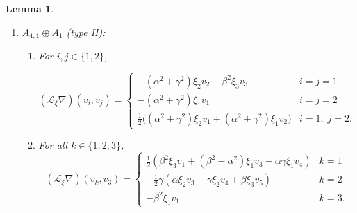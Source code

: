 \documentclass[10pt]{article}
\newtheorem{Lemma}{Lemma}
\begin{document}
\begin{Lemma}
\begin{enumerate}
\begin{enumerate}
\begin{align*} 
(\mathscr{L}_\xi\nabla)(v_i,v_j)=\tfrac{1}{2}\Big(a_j g_i+b_j h_i+ a_i g_j+b_i h_j\Big). 
\end{align*}
\item For $i\in\{1,2,3\}$, and $j=3$.\\  
\[
(\mathscr{L}_\xi\nabla)(v_i,v_3) =
\begin{cases} 
\tfrac{1}{2}\Big(\beta(\gamma\xi_2+\beta\xi_3)v_1+\beta\gamma\xi_1 v_2+(\beta^2-\alpha^2)\xi_1 v_3-\alpha\gamma\xi_1 v_5\Big) & i=1 \\ 
-\tfrac{1}{2}\Big(2\beta\gamma\xi_1 v_1+\alpha^2\xi_2 v_3 +\alpha(\gamma\xi_2+\beta\xi_3) v_5\Big)& i=2\\
-\beta^2\xi_1 v_1&i=3.
\end{cases}
\]
\item For $i\in \{1,2,3,5\}$ and $j=5.$

\[
(\mathscr{L}_\xi\nabla)(v_i,v_5) =
\begin{cases} 
\tfrac{1}{2}\Big(\alpha\beta\xi_2v_1-\alpha\gamma\xi_1 v_3+(\beta^2+\gamma^2)\xi_1 v_5\Big) & i=1 \\ 
-\tfrac{1}{2}\Big(2\beta\gamma\xi_1 v_1+\alpha^2\xi_2 v_3 +\alpha(\gamma\xi_2+\beta\xi_3) v_5\Big)& i=2\\
\tfrac{1}{2}\beta\Big(-\alpha\xi_2v_3-(\gamma\xi_2+\beta\xi_3)v_5\Big)&i=3\\
0&i=5.
\end{cases}
\]
\end{enumerate}


  \item \(A_{4,1}\oplus A_1\) (type II):\\
  \begin{enumerate}
      \item  For $i,j\in\{1,2\}$,

      \begin{equation*} 
( \mathscr{L}_\xi\nabla)(v_i,v_j)=\begin{cases} 
-(\alpha^2+\gamma^2)\xi_2v_2-\beta^2\xi_3v_3 & i=j=1\\ 
-(\alpha^2+\gamma^2)\xi_1v_1 & i=j=2\\ 
\tfrac{1}{2}\Big((\alpha^2+\gamma^2)\xi_2v_1+(\alpha^2+\gamma^2)\xi_1v_2\Big) & i=1,\; j=2. 
\end{cases}
\end{equation*}
  
\item For all $k\in\{1,2,3\}$,
\begin{equation*} (\mathscr{L}_\xi\nabla)(v_k,v_3)=\begin{cases} 
\tfrac{1}{2}(\beta^2\xi_3v_1+(\beta^2-\alpha^2)\xi_1v_3-\alpha\gamma\xi_1 v_4) & k=1\\ 
-\tfrac{1}{2}\gamma(\alpha\xi_2v_3+\gamma\xi_2v_4+\beta\xi_3v_5)& k=2 \\ 
-\beta^2\xi_1v_1 & k=3.
\end{cases} \end{equation*}


\end{enumerate}
\end{enumerate}
\end{Lemma}
\end{document}
